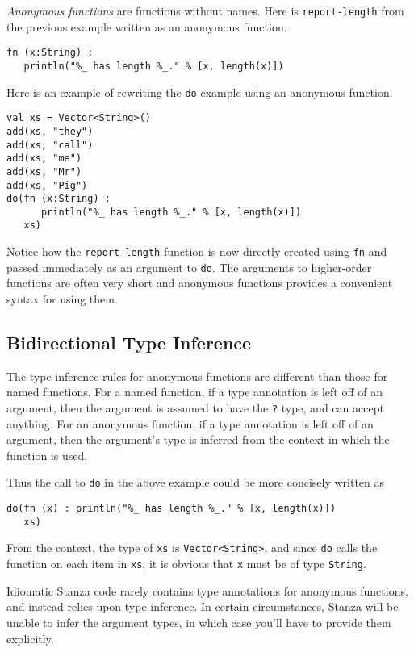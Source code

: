 \documentclass[10pt,oneside]{book}
\begin{document}
{\em Anonymous functions} are functions without names. Here is \texttt{\frenchspacing report-length} from the previous example written as an anonymous function.
\begin{lstlisting}
fn (x:String) :
   println("%_ has length %_." % [x, length(x)])
\end{lstlisting}

Here is an example of rewriting the \texttt{\frenchspacing do} example using an anonymous function.
\begin{lstlisting}
val xs = Vector<String>()
add(xs, "they")
add(xs, "call")
add(xs, "me")
add(xs, "Mr")
add(xs, "Pig")
do(fn (x:String) :
      println("%_ has length %_." % [x, length(x)])
   xs)
\end{lstlisting}
Notice how the \texttt{\frenchspacing report-length} function is now directly created using \texttt{\frenchspacing fn} and passed immediately as an argument to \texttt{\frenchspacing do}. The arguments to higher-order functions are often very short and anonymous functions provides a convenient syntax for using them.

\subsection*{Bidirectional Type Inference}
The type inference rules for anonymous functions are different than those for named functions. For a named function, if a type annotation is left off of an argument, then the argument is assumed to have the \texttt{\frenchspacing ?} type, and can accept anything. For an anonymous function, if a type annotation is left off of an argument, then the argument's type is inferred from the context in which the function is used. 

Thus the call to \texttt{\frenchspacing do} in the above example could be more concisely written as
\begin{lstlisting}
do(fn (x) : println("%_ has length %_." % [x, length(x)])
   xs)
\end{lstlisting}
From the context, the type of \texttt{\frenchspacing xs} is \texttt{\frenchspacing Vector<String>}, and since \texttt{\frenchspacing do} calls the function on each item in \texttt{\frenchspacing xs}, it is obvious that \texttt{\frenchspacing x} must be of type \texttt{\frenchspacing String}.

Idiomatic Stanza code rarely contains type annotations for anonymous functions, and instead relies upon type inference. In certain circumstances, Stanza will be unable to infer the argument types, in which case you'll have to provide them explicitly.
\end{document}
